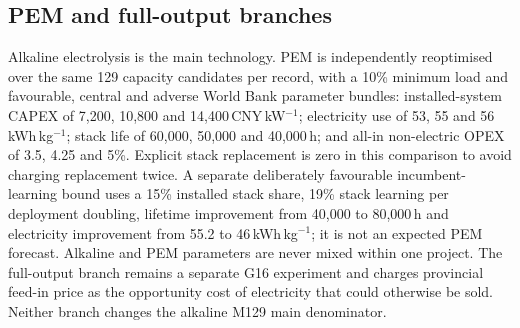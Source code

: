 \documentclass[11pt,a4paper]{article}
\begin{document}
\subsection{PEM and full-output branches}

Alkaline electrolysis is the main technology. PEM is independently reoptimised over the same 129 capacity candidates per record, with a 10\% minimum load and favourable, central and adverse World Bank parameter bundles: installed-system CAPEX of 7,200, 10,800 and 14,400\,CNY\,kW$^{-1}$; electricity use of 53, 55 and 56\,kWh\,kg$^{-1}$; stack life of 60,000, 50,000 and 40,000\,h; and all-in non-electric OPEX of 3.5, 4.25 and 5\%\cite{worldbank2026}. Explicit stack replacement is zero in this comparison to avoid charging replacement twice. A separate deliberately favourable incumbent-learning bound uses a 15\% installed stack share, 19\% stack learning per deployment doubling, lifetime improvement from 40,000 to 80,000\,h and electricity improvement from 55.2 to 46\,kWh\,kg$^{-1}$; it is not an expected PEM forecast. Alkaline and PEM parameters are never mixed within one project. The full-output branch remains a separate G16 experiment and charges provincial feed-in price as the opportunity cost of electricity that could otherwise be sold. Neither branch changes the alkaline M129 main denominator.
\end{document}
